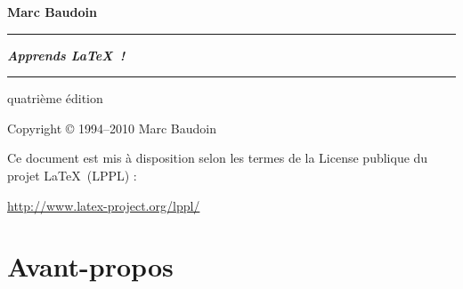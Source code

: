 \documentclass[a4paper,11pt,openbib]{book}
\newenvironment{toile}
{%
   \def\FrameCommand{\textcolor[gray]{0.7}{\vrule width 3pt}\hspace{0.7em}}%
   \MakeFramed{\advance\hsize-\width \FrameRestore}%
}%
{\endMakeFramed}
\newcommand{\toileurl}[1]{\noindent\url{#1}\par}
\begin{document}

\frontmatter


\begin{titlepage}



\begin{center}
\LARGE\sffamily\bfseries Marc Baudoin
\end{center}


\noindent\rule{\linewidth}{3pt}

\begin{center}
\Huge\bfseries\itshape Apprends \LaTeX\ !
\end{center}

\noindent\rule{\linewidth}{3pt}


\begin{center}
\large\sffamily quatrième édition
\end{center}


\clearpage


\thispagestyle{empty}

\noindent Copyright © 1994--2010 Marc Baudoin

\bigskip

Ce document est mis à disposition selon les termes de la License publique du
projet \LaTeX\ (LPPL) :

\begin{toile}
\toileurl{http://www.latex-project.org/lppl/}
\end{toile}

\end{titlepage}


\pagestyle{plain}

\chapter*{Avant-propos}
\end{document}

